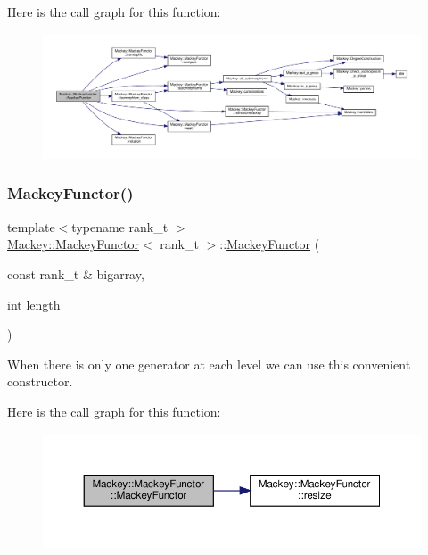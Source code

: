 Here is the call graph for this function\+:\nopagebreak
\begin{figure}[H]
\begin{center}
\leavevmode
\includegraphics[width=350pt]{classMackey_1_1MackeyFunctor_a075cd364217700d5f5c2459d4a988a93_cgraph}
\end{center}
\end{figure}
\mbox{\label{classMackey_1_1MackeyFunctor_a7cdc1be794a7b39e7d4b86c2ad26355e}} 
\subsubsection{\texorpdfstring{Mackey\+Functor()}{MackeyFunctor()}\hspace{0.1cm}{\footnotesize\ttfamily [2/2]}}
{\footnotesize\ttfamily template$<$typename rank\+\_\+t $>$ \\
\hyperlink{classMackey_1_1MackeyFunctor}{Mackey\+::\+Mackey\+Functor}$<$ rank\+\_\+t $>$\+::\hyperlink{classMackey_1_1MackeyFunctor}{Mackey\+Functor} (\begin{DoxyParamCaption}\item[{const rank\+\_\+t \&}]{bigarray,  }\item[{int}]{length }\end{DoxyParamCaption})}



When there is only one generator at each level we can use this convenient constructor. 

Here is the call graph for this function\+:\nopagebreak
\begin{figure}[H]
\begin{center}
\leavevmode
\includegraphics[width=350pt]{classMackey_1_1MackeyFunctor_a7cdc1be794a7b39e7d4b86c2ad26355e_cgraph}
\end{center}
\end{figure}


